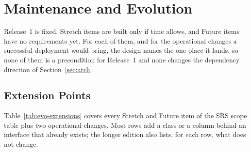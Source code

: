 \section{Maintenance and Evolution}\label{sec:evo}

Release~1 is fixed. Stretch items are built only if time allows, and Future items have no requirements yet. For each of them, and for the operational changes a successful deployment would bring, the design names the one place it lands, so none of them is a precondition for Release~1 and none changes the dependency direction of Section~\ref{sec:arch}.

\subsection{Extension Points}

Table~\ref{tab:evo-extensions} covers every Stretch and Future item of the SRS scope table plus two operational changes. Most rows add a class or a column behind an interface that already exists; the longer edition also lists, for each row, what does not change.

